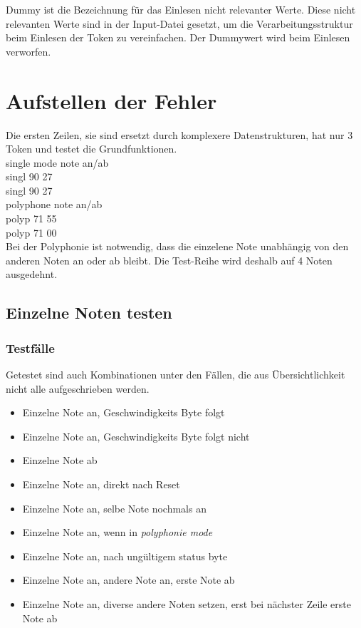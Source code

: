 Dummy ist die Bezeichnung für das Einlesen nicht relevanter Werte. Diese nicht relevanten Werte sind in der Input-Datei gesetzt, um die Verarbeitungsstruktur beim Einlesen der Token zu vereinfachen. Der Dummywert wird beim Einlesen verworfen.\\
 
\section{Aufstellen der Fehler}\label{sec.testbench_fehler} 

Die ersten Zeilen, sie sind ersetzt durch komplexere Datenstrukturen, hat nur 3 Token und testet die Grundfunktionen.\\

single mode note an/ab\\
singl 90 27\\ 
singl 90 27\\

polyphone note an/ab\\
polyp 71 55\\
polyp 71 00\\

Bei der Polyphonie ist notwendig, dass die einzelene Note unabhängig von den anderen Noten an oder ab bleibt. Die Test-Reihe wird deshalb auf 4 Noten ausgedehnt.


\subsection{Einzelne Noten testen}
 
\subsubsection{Testfälle}
Getestet sind auch Kombinationen unter den Fällen, die aus Übersichtlichkeit nicht alle aufgeschrieben werden.\\
\begin{itemize}
\item Einzelne Note an, Geschwindigkeits Byte folgt
\item Einzelne Note an, Geschwindigkeits Byte folgt nicht
\item Einzelne Note ab
\item Einzelne Note an, direkt nach Reset
\item Einzelne Note an, selbe Note nochmals an
\item Einzelne Note an, wenn in \textit{polyphonie mode}
\item Einzelne Note an, nach ungültigem status byte
\item Einzelne Note an, andere Note an, erste Note ab
\item Einzelne Note an, diverse andere Noten setzen, erst bei nächster Zeile erste Note ab
\end{itemize}

